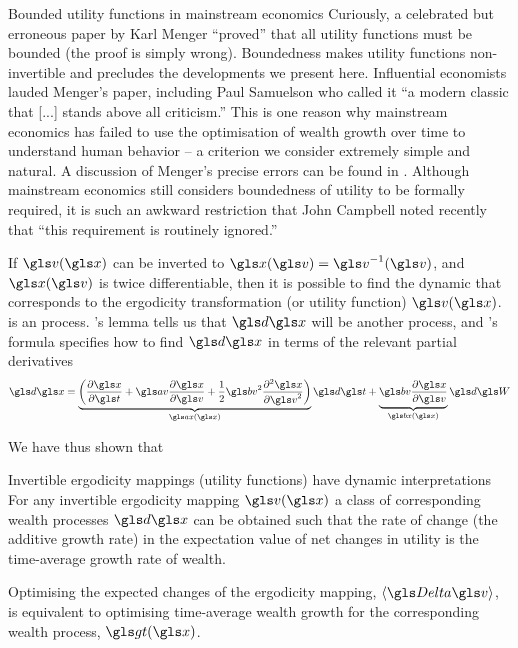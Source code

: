 \begin{itemize}
\begin{history}{Bounded utility functions in mainstream economics}
Curiously, a celebrated but erroneous paper by Karl Menger \cite{Menger1934} 
``proved'' that all utility functions must be bounded (the proof is simply wrong). Boundedness makes 
utility functions non-invertible and precludes the developments we present here. Influential economists 
lauded Menger's paper, including Paul Samuelson \cite[p.~49]{Samuelson1977} who called it ``a modern 
classic that [...] stands above all criticism.'' This is one reason why mainstream economics
has failed to use the optimisation of wealth growth over time to understand human behavior -- 
a criterion we consider extremely simple and natural. A  discussion of Menger's precise errors 
can be found in \cite[p.~7]{PetersGell-Mann2016}. Although mainstream economics still considers 
boundedness of utility to be formally required, it is such an awkward restriction that John Campbell 
noted recently \cite{Campbell2017} that ``this requirement is routinely ignored.''
\end{history}


If $\gv(\x)$ can be inverted to $\x(\gv)=\gv^{-1}(\gv)$, and $\x(\gv)$ is twice differentiable,
then it is possible to find the dynamic that corresponds to the ergodicity transformation (or utility function)
$\gv(\x)$.   is an \Ito process. \Ito's lemma tells us that $\gd\x$
will be another \Ito process, and \Ito's formula specifies how to find $
\gd\x$
in terms of the relevant partial derivatives
\begin{equation}
\gd\x = \underbrace{\left(\frac{\partial \x}{\partial \t}+\av \frac{\partial \x}{\partial \gv} + \frac{1}{2}\bv^2\frac{\partial^2 \x}{\partial \gv^2}\right)}_{\ax(\x)}\gd\t + \underbrace{\bv \frac{\partial \x}{\partial \gv}}_{\bx(\x)} \gd\gW
\elabel{dx}
\end{equation}

We have thus shown that 
\begin{keypts}{Invertible ergodicity mappings (utility functions) have dynamic interpretations}
For any invertible ergodicity mapping $\gv(\x)$ a class of corresponding
wealth processes $\gd\x$ can be obtained such that the rate of
change (\ie the additive growth rate) in the expectation value of net changes 
in utility is the time-average growth rate of wealth.
\end{keypts}
Optimising the expected changes of the ergodicity mapping, $\ave{\D\gv}$,
is equivalent to optimising time-average wealth growth for the
corresponding wealth process, $\gt(\x)$. 


\end{itemize}
